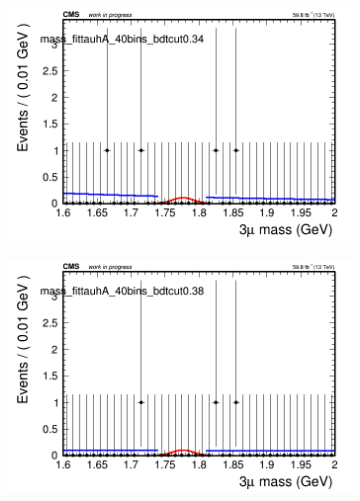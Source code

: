 \begin{figure}[H]
\begin{subfigure}{0.2\textwidth}
        \caption{}
    \end{subfigure}
    \begin{subfigure}{0.2\textwidth}
        \includegraphics[width=\textwidth]{unfixed_exp/plots/tauhA/massfit_tauhA_40bins_bdtcut0.34.png}
        \caption{}
    \end{subfigure}
    \begin{subfigure}{0.2\textwidth}
        \includegraphics[width=\textwidth]{unfixed_exp/plots/tauhA/massfit_tauhA_40bins_bdtcut0.38.png}
        \caption{}
    \end{subfigure}
    \begin{subfigure}{0.2\textwidth}

\end{subfigure}
\end{figure}
